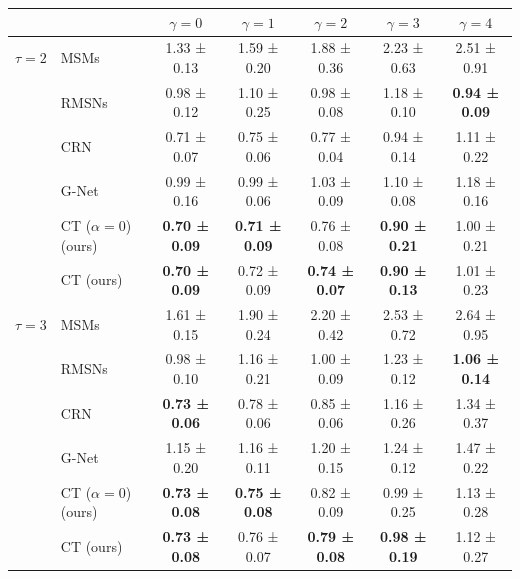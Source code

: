 \begin{tabular}{ll|ccccc}
\toprule
           &           &          $\gamma = 0$ &          $\gamma = 1$ &          $\gamma = 2$ &          $\gamma = 3$ &          $\gamma = 4$ \\
\midrule
$\tau = 2$ & MSMs &           1.33 ± 0.13 &           1.59 ± 0.20 &           1.88 ± 0.36 &           2.23 ± 0.63 &           2.51 ± 0.91 \\
           & RMSNs &           0.98 ± 0.12 &           1.10 ± 0.25 &           0.98 ± 0.08 &           1.18 ± 0.10 &  \textbf{0.94 ± 0.09} \\
           & CRN &           0.71 ± 0.07 &           0.75 ± 0.06 &           0.77 ± 0.04 &           0.94 ± 0.14 &           1.11 ± 0.22 \\
\vspace{0.9mm}
           & G-Net &           0.99 ± 0.16 &           0.99 ± 0.06 &           1.03 ± 0.09 &           1.10 ± 0.08 &           1.18 ± 0.16 \\
           & CT ($\alpha = 0$) (ours) &  \textbf{0.70 ± 0.09} &  \textbf{0.71 ± 0.09} &           0.76 ± 0.08 &  \textbf{0.90 ± 0.21} &           1.00 ± 0.21 \\
           & CT (ours) &  \textbf{0.70 ± 0.09} &           0.72 ± 0.09 &  \textbf{0.74 ± 0.07} &  \textbf{0.90 ± 0.13} &           1.01 ± 0.23 \\
\midrule
$\tau = 3$ & MSMs &           1.61 ± 0.15 &           1.90 ± 0.24 &           2.20 ± 0.42 &           2.53 ± 0.72 &           2.64 ± 0.95 \\
           & RMSNs &           0.98 ± 0.10 &           1.16 ± 0.21 &           1.00 ± 0.09 &           1.23 ± 0.12 &  \textbf{1.06 ± 0.14} \\
           & CRN &  \textbf{0.73 ± 0.06} &           0.78 ± 0.06 &           0.85 ± 0.06 &           1.16 ± 0.26 &           1.34 ± 0.37 \\
\vspace{0.9mm}
           & G-Net &           1.15 ± 0.20 &           1.16 ± 0.11 &           1.20 ± 0.15 &           1.24 ± 0.12 &           1.47 ± 0.22 \\
           & CT ($\alpha = 0$) (ours) &  \textbf{0.73 ± 0.08} &  \textbf{0.75 ± 0.08} &           0.82 ± 0.09 &           0.99 ± 0.25 &           1.13 ± 0.28 \\
           & CT (ours) &  \textbf{0.73 ± 0.08} &           0.76 ± 0.07 &  \textbf{0.79 ± 0.08} &  \textbf{0.98 ± 0.19} &           1.12 ± 0.27 \\

\end{tabular}
